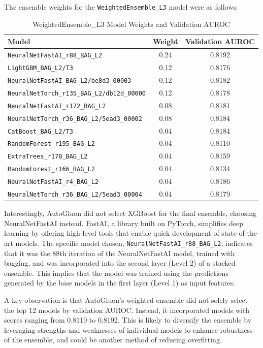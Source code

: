 \documentclass[letterpaper]{article}
\begin{document}
	The ensemble weights for the \texttt{WeightedEnsemble\_L3} model were as follows:
	
	\begin{table}[H]
		\centering
		\caption{WeightedEnsemble\_L3 Model Weights and Validation AUROC}
		\begin{tabular}{lcc}
			\hline
			Model & Weight & Validation AUROC \\
			\hline
			\texttt{NeuralNetFastAI\_r88\_BAG\_L2} & 0.24 & 0.8192 \\
			\texttt{LightGBM\_BAG\_L2/T3} & 0.12 & 0.8176 \\
			\texttt{NeuralNetFastAI\_BAG\_L2/be8d3\_00003} & 0.12 & 0.8182 \\
			\texttt{NeuralNetTorch\_r135\_BAG\_L2/db12d\_00000} & 0.12 & 0.8178 \\
			\texttt{NeuralNetFastAI\_r172\_BAG\_L2} & 0.08 & 0.8181 \\
			\texttt{NeuralNetTorch\_r36\_BAG\_L2/5ead3\_00002} & 0.08 & 0.8184 \\
			\texttt{CatBoost\_BAG\_L2/T3} & 0.04 & 0.8184 \\
			\texttt{RandomForest\_r195\_BAG\_L2} & 0.04 & 0.8110 \\
			\texttt{ExtraTrees\_r178\_BAG\_L2} & 0.04 & 0.8159 \\
			\texttt{RandomForest\_r166\_BAG\_L2} & 0.04 & 0.8134 \\
			\texttt{NeuralNetFastAI\_r4\_BAG\_L2} & 0.04 & 0.8186 \\
			\texttt{NeuralNetTorch\_r36\_BAG\_L2/5ead3\_00004} & 0.04 & 0.8179 \\
			\hline
		\end{tabular}
		\label{tab:ensemble_weights_2}
	\end{table}
	
	Interestingly, AutoGluon did not select XGBoost for the final ensemble, choosing NeuralNetFastAI instead. FastAI, a library built on PyTorch, simplifies deep learning by offering high-level tools that enable quick development of state-of-the-art models. The specific model chosen, \texttt{NeuralNetFastAI\_r88\_BAG\_L2}, indicates that it was the 88th iteration of the NeuralNetFastAI model, trained with bagging, and was incorporated into the second layer (Level 2) of a stacked ensemble. This implies that the model was trained using the predictions generated by the base models in the first layer (Level 1) as input features.
	
	A key observation is that AutoGluon's weighted ensemble did not solely select the top 12 models by validation AUROC. Instead, it incorporated models with scores ranging from 0.8110 to 0.8192. This is likely to diversify the ensemble by leveraging strengths and weaknesses of individual models to enhance robustness of the ensemble, and could be another method of reducing overfitting.
	
\end{document}
